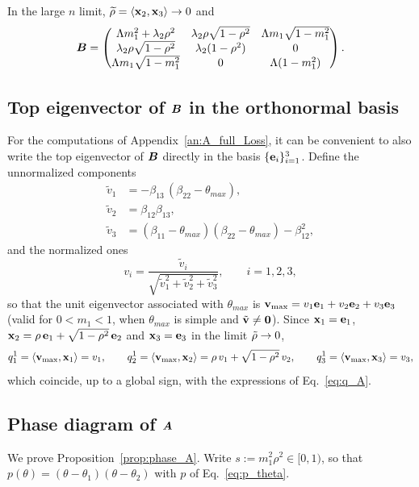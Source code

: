 \noindent
In the large $n$ limit, $\widetilde\rho =  \langle  \boldsymbol{\mathbf{x}}_2, \boldsymbol{\mathbf{x}}_3 \rangle \to0$ and
\begin{equation}
    \bm{B} =
    \begin{pmatrix}
        \Lambda m_1^2 + \lambda_2\rho^2 & \lambda_2\rho\sqrt{1-\rho^2} & \Lambda m_1\sqrt{1-m_1^2}\\
        \lambda_2\rho\sqrt{1-\rho^2} & \lambda_2(1-\rho^2) & 0\\
        \Lambda m_1\sqrt{1-m_1^2} & 0 & \Lambda(1-m_1^2)
    \end{pmatrix}.
    \label{eq:B_A_limit}
\end{equation}

\subsection{Top eigenvector of $\bm{B}$ in the orthonormal basis}\label{sec:v_max_methodeA}
For the computations of Appendix~\ref{an:A_full_Loss}, it can be convenient to also write the top eigenvector of $\bm{B}$ directly in the basis $\{\boldsymbol{\mathbf{e}}_i\}_{i=1}^3$. Define the unnormalized components
\[
\begin{aligned}
\tilde v_1&=-\beta_{13}\,(\beta_{22}-\theta_{max}),\\
\tilde v_2&=\beta_{12}\beta_{13},\\
\tilde v_3&=(\beta_{11}-\theta_{max})(\beta_{22}-\theta_{max})-\beta_{12}^2,
\end{aligned}
\]
and the normalized ones
\[
v_i=\frac{\tilde v_i}{\sqrt{\tilde v_1^2+\tilde v_2^2+\tilde v_3^2}},\qquad i=1,2,3,
\]
so that the unit eigenvector associated with $\theta_{max}$ is
$\boldsymbol{\mathbf{v}}_{\max}=v_1\boldsymbol{\mathbf{e}}_1+v_2\boldsymbol{\mathbf{e}}_2+v_3\boldsymbol{\mathbf{e}}_3$
(valid for $0<m_1<1$, when $\theta_{max}$ is simple and $\tilde{\boldsymbol{\mathbf{v}}}\neq\boldsymbol{\mathbf{0}}$).
Since $\boldsymbol{\mathbf{x}}_1=\boldsymbol{\mathbf{e}}_1$, $\boldsymbol{\mathbf{x}}_2=\rho\,\boldsymbol{\mathbf{e}}_1+\sqrt{1-\rho^2}\,\boldsymbol{\mathbf{e}}_2$ and $\boldsymbol{\mathbf{x}}_3=\boldsymbol{\mathbf{e}}_3$ in the limit $\Tilde{\rho}\to0$,
\[
q_1^1 = \langle\boldsymbol{\mathbf{v}}_{\max},\boldsymbol{\mathbf{x}}_1\rangle=v_1,\qquad
q_2^1 = \langle\boldsymbol{\mathbf{v}}_{\max},\boldsymbol{\mathbf{x}}_2\rangle=\rho\, v_1+\sqrt{1-\rho^2}\,v_2 ,\qquad
q_3^1 = \langle\boldsymbol{\mathbf{v}}_{\max},\boldsymbol{\mathbf{x}}_3\rangle=v_3,
\]
which coincide, up to a global sign, with the expressions of Eq.~\eqref{eq:q_A}.

\subsection{Phase diagram of $\bm{A}$}\label{adix:phase_A}
We prove Proposition~\ref{prop:phase_A}. Write $s := m_1^2\rho^2 \in [0,1)$, so that $p(\theta) = (\theta-\theta_1)(\theta-\theta_2)$ with $p$ of Eq.~\eqref{eq:p_theta}.

